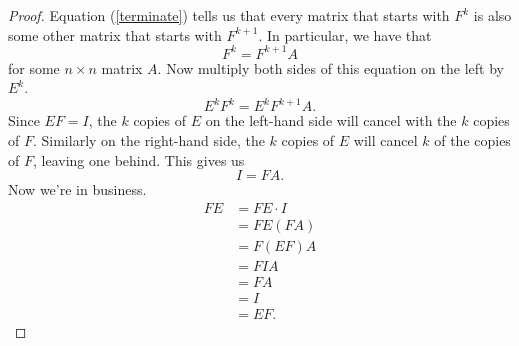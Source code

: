 \documentclass[12pt]{article}
\begin{document}
\begin{proof}
	\noindent Equation (\ref{terminate}) tells us that every matrix that starts with $F^k$ is also some other matrix that starts with $F^{k+1}$. In particular, we have that
	\begin{equation}
		F^k = F^{k+1}A
	\end{equation}
	for some $n\times n$ matrix $A$. Now multiply both sides of this equation on the left by $E^k$.
	\begin{equation}
		E^kF^k = E^kF^{k+1}A.
	\end{equation}
	Since $EF = I$, the $k$ copies of $E$ on the left-hand side will cancel with the $k$ copies of $F$. Similarly on the right-hand side, the $k$ copies of $E$ will cancel $k$ of the copies of $F$, leaving one behind. This gives us
	\begin{equation}
		I = FA.
	\end{equation}
	Now we're in business.
	\begin{align*}
		FE &= FE\cdot I\\
		&= FE(FA)\\
		&= F(EF)A\\
		&= FIA\\
		&= FA\\
		&= I\\
		&= EF.
	\end{align*}
\end{proof}
\end{document}
